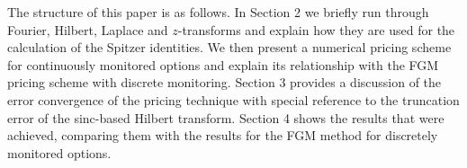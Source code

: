 \documentclass[11pt,a4paper]{article}
\begin{document}



The structure of this paper is as follows. In Section 2 we briefly run through Fourier, Hilbert, Laplace and $z$-transforms and explain how they are used for the calculation of the Spitzer identities. We then present a numerical pricing scheme for continuously monitored options and explain its relationship with the FGM pricing scheme with discrete monitoring. Section 3 provides a discussion of the error convergence of the pricing technique with special reference to the truncation error of the sinc-based Hilbert transform. Section 4 shows the results that were achieved, comparing them with the results for the FGM method for discretely monitored options.
\end{document}
